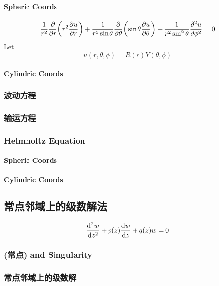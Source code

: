 \documentclass[UTF8]{ctexart} %
\numberwithin{equation}{section}
\begin{document}
\paragraph{Spheric Coords}
\begin{equation}\label{key}
\dfrac{1}{r^2}\pdv{r}\qty(r^2\pdv{u}{r}) + \dfrac{1}{r^2\sin\theta}\pdv{\theta}\qty(\sin\theta\pdv{u}{\theta}) + \dfrac{1}{r^2\sin^2\theta}\pdv[2]{u}{\phi} = 0
\end{equation}
Let
\begin{equation}\label{key}
u(r,\theta,\phi) = R(r)Y(\theta,\phi)
\end{equation}

\paragraph{Cylindric Coords}

\subsubsection{波动方程}

\subsubsection{输运方程}

\subsubsection{Helmholtz Equation}
\paragraph{Spheric Coords}
\paragraph{Cylindric Coords}

\subsection{常点邻域上的级数解法}
\begin{equation}\label{key}
\dv[2]{w}{z} + p(z)\dv{w}{z} + q(z)w = 0
\end{equation}
\subsubsection{(常点) and Singularity}

\subsubsection{常点邻域上的级数解}
\end{document}

